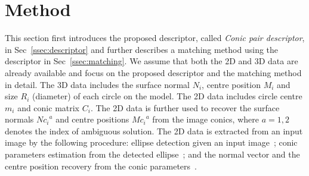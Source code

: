 \documentclass{bmvc2k}
\newcommand{\sref}[1]{Sec\bmvaOneDot~\ref{#1}}
\newcommand{\hemal}[2]{\textcolor{red}{\sout{#1}} \textcolor{green}{#2}}
\def\etal{\emph{et al}\bmvaOneDot}
\begin{document}
\section{Method}
This section first introduces the proposed descriptor, called {\textit{Conic pair descriptor}}, in \sref{ssec:descriptor} and  further describes a matching method using the descriptor in \sref{ssec:matching}.
We assume that both the 2D and 3D data are already available and focus on the proposed descriptor and the matching method in detail.
The 3D data includes the surface normal $N_i$, centre position $M_i$ and size $R_i$ (diameter) of each circle on the model. 
The 2D data includes circle centre $ m_i $ and conic matrix $ C_i $.
The 2D data is further used to recover the surface normals ${Nc_i}^a$ and centre positions ${Mc_i}^a$ from the image conics, where $a ={1,2}$ denotes the index of ambiguous solution. 
The 2D data is extracted from an input image by the following procedure:
ellipse detection given an input image~\cite{naimark_circular_2002};
conic parameters estimation from the detected ellipse~\cite{farin_geometry_1998}; and
the normal vector and the centre position recovery from the conic parameters~\cite{lo_pez_de_ipin_a_trip:_2002}.
\end{document}
